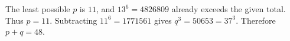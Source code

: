 The least possible $p$ is $11$, and $13^6=4826809$ already exceeds the given total. Thus $p=11$. Subtracting $11^6=1771561$ gives $q^3=50653=37^3$. Therefore $\boxed{p+q=48}$.
